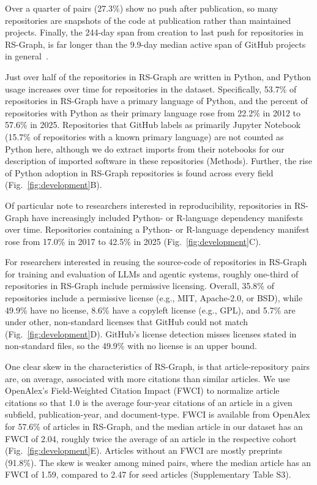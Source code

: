 \documentclass[pdflatex,sn-nature]{sn-jnl}%
\begin{document}
Over a quarter of pairs (27.3\%) show no push after publication, so many repositories are snapshots of the code at publication rather than maintained projects. Finally, the 244-day span from creation to last push for repositories in RS-Graph, is far longer than the 9.9-day median active span of GitHub projects in general~\cite{kalliamvakou2016promises}.

Just over half of the repositories in RS-Graph are written in Python, and Python usage increases over time for repositories in the dataset. Specifically, 53.7\% of repositories in RS-Graph have a primary language of Python, and the percent of repositories with Python as their primary language rose from 22.2\% in 2012 to 57.6\% in 2025. Repositories that GitHub labels as primarily Jupyter Notebook (15.7\% of repositories with a known primary language) are not counted as Python here, although we do extract imports from their notebooks for our description of imported software in these repositories (Methods). Further, the rise of Python adoption in RS-Graph repositories is found across every field (Fig.~\ref{fig:development}B).

Of particular note to researchers interested in reproducibility, repositories in RS-Graph have increasingly included Python- or R-language dependency manifests over time. Repositories containing a Python- or R-language dependency manifest rose from 17.0\% in 2017 to 42.5\% in 2025 (Fig.~\ref{fig:development}C).

For researchers interested in reusing the source-code of repositories in RS-Graph for training and evaluation of LLMs and agentic systems, roughly one-third of repositories in RS-Graph include permissive licensing. Overall, 35.8\% of repositories include a permissive license (e.g., MIT, Apache-2.0, or BSD), while 49.9\% have no license, 8.6\% have a copyleft license (e.g., GPL), and 5.7\% are under other, non-standard licenses that GitHub could not match (Fig.~\ref{fig:development}D). GitHub's license detection misses licenses stated in non-standard files, so the 49.9\% with no license is an upper bound.

One clear skew in the characteristics of RS-Graph, is that article-repository pairs are, on average, associated with more citations than similar articles. We use OpenAlex's Field-Weighted Citation Impact (FWCI) to normalize article citations so that 1.0 is the average four-year citations of an article in a given subfield, publication-year, and document-type. FWCI is available from OpenAlex for 57.6\% of articles in RS-Graph, and the median article in our dataset has an FWCI of 2.04, roughly twice the average of an article in the respective cohort (Fig.~\ref{fig:development}E). Articles without an FWCI are mostly preprints (91.8\%). The skew is weaker among mined pairs, where the median article has an FWCI of 1.59, compared to 2.47 for seed articles (Supplementary Table S3).
\end{document}
